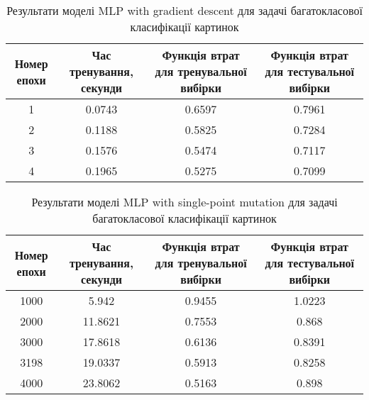 \begin{table}[ht]
	\centering
	\begin{adjustbox}{max width=\textwidth}
		\begin{tabular}{|c|c|c|c|}
			\hline 
			Номер епохи & Час тренування, секунди & Функція втрат для тренувальної вибірки & Функція втрат для тестувальної вибірки \\
			\hline 
			1 & 0.0743 & 0.6597 & 0.7961 \\
			\hline 
			2 & 0.1188 & 0.5825 & 0.7284 \\
			\hline
			3 & 0.1576 & 0.5474 & 0.7117 \\
			\hline
			4 & 0.1965 & 0.5275 & 0.7099 \\
			\hline
		\end{tabular}
	\end{adjustbox}
	\caption{Результати моделі MLP with gradient descent для задачі багатокласової класифікації картинок}
	\label{mlp_gd_mc_id_results}
\end{table}

\begin{table}[ht]
	\centering
	\begin{adjustbox}{max width=\textwidth}
		\begin{tabular}{|c|c|c|c|}
			\hline 
			Номер епохи & Час тренування, секунди & Функція втрат для тренувальної вибірки & Функція втрат для тестувальної вибірки \\
			\hline 
			1000 & 5.942 & 0.9455 & 1.0223 \\
			\hline 
			2000 & 11.8621 & 0.7553 & 0.868 \\
			\hline
			3000 & 17.8618 & 0.6136 & 0.8391 \\
			\hline
			3198 & 19.0337 & 0.5913 & 0.8258 \\
			\hline
			4000 & 23.8062 & 0.5163 & 0.898 \\
			\hline
		\end{tabular}
	\end{adjustbox}
	\caption{Результати моделі MLP with single-point mutation для задачі багатокласової класифікації картинок}
	\label{mlp_spm_mc_id_results}
\end{table}

